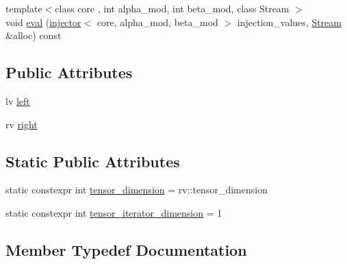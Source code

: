 \begin{DoxyCompactItemize}
\item 
{\footnotesize template$<$class core , int alpha\+\_\+mod, int beta\+\_\+mod, class Stream $>$ }\\void \hyperlink{structBC_1_1tensors_1_1exprs_1_1Binary__Expression_3_01oper_1_1gemm_3_01System__Tag_01_4_00_01lv_00_01rv_01_4_acf10fe42e21e26d47e02ac98a5205cdf}{eval} (\hyperlink{structBC_1_1tensors_1_1exprs_1_1injector}{injector}$<$ core, alpha\+\_\+mod, beta\+\_\+mod $>$ injection\+\_\+values, \hyperlink{namespaceBC_abc64a63cd29a22d102a68f478dfd588d}{Stream} \&alloc) const 
\end{DoxyCompactItemize}
\subsection*{Public Attributes}
\begin{DoxyCompactItemize}
\item 
lv \hyperlink{structBC_1_1tensors_1_1exprs_1_1Binary__Expression_3_01oper_1_1gemm_3_01System__Tag_01_4_00_01lv_00_01rv_01_4_a961a2d6095d05b27cd603867a9077301}{left}
\item 
rv \hyperlink{structBC_1_1tensors_1_1exprs_1_1Binary__Expression_3_01oper_1_1gemm_3_01System__Tag_01_4_00_01lv_00_01rv_01_4_af7846bf959d293e2e8bd573955536c08}{right}
\end{DoxyCompactItemize}
\subsection*{Static Public Attributes}
\begin{DoxyCompactItemize}
\item 
static constexpr int \hyperlink{structBC_1_1tensors_1_1exprs_1_1Binary__Expression_3_01oper_1_1gemm_3_01System__Tag_01_4_00_01lv_00_01rv_01_4_abd656893dc2690374ba6f86ceb4c476b}{tensor\+\_\+dimension} = rv\+::tensor\+\_\+dimension
\item 
static constexpr int \hyperlink{structBC_1_1tensors_1_1exprs_1_1Binary__Expression_3_01oper_1_1gemm_3_01System__Tag_01_4_00_01lv_00_01rv_01_4_a055ab0c4f9c5f19a5d7eeafdfa7119b3}{tensor\+\_\+iterator\+\_\+dimension} = 1
\end{DoxyCompactItemize}


\subsection{Member Typedef Documentation}
